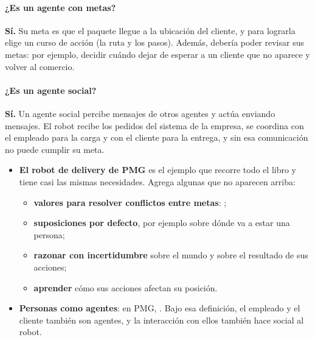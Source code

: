 \documentclass[11pt,a4paper]{article}
\begin{document}
\paragraph{¿Es un agente con metas?} \textbf{Sí.} Su meta es que el paquete llegue a la ubicación del cliente, y para lograrla elige un curso de acción (la ruta y los pasos). Además, debería poder revisar sus metas: por ejemplo, decidir cuándo dejar de esperar a un cliente que no aparece y volver al comercio.

\paragraph{¿Es un agente social?} \textbf{Sí.} Un agente social percibe mensajes de otros agentes y actúa enviando mensajes. El robot recibe los pedidos del sistema de la empresa, se coordina con el empleado para la carga y con el cliente para la entrega, y sin esa comunicación no puede cumplir su meta.

\begin{extras}
\begin{itemize}
  \item \textbf{El robot de delivery de PMG} es el ejemplo que recorre todo el libro y tiene casi las mismas necesidades. Agrega algunas que no aparecen arriba:
  \begin{itemize}
    \item \textbf{valores para resolver conflictos entre metas}: ;
    \item \textbf{suposiciones por defecto}, por ejemplo sobre dónde va a estar una persona;
    \item \textbf{razonar con incertidumbre} sobre el mundo y sobre el resultado de sus acciones;
    \item \textbf{aprender} cómo sus acciones afectan su posición.
  \end{itemize}
  \item \textbf{Personas como agentes}: en PMG, . Bajo esa definición, el empleado y el cliente también son agentes, y la interacción con ellos también hace social al robot.
\end{itemize}
\end{extras}
\end{document}
